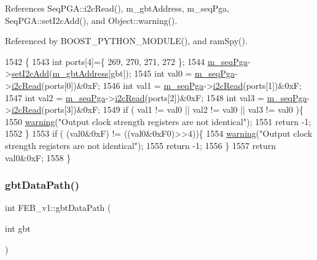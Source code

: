 References Seq\+P\+G\+A\+::i2c\+Read(), m\+\_\+gbt\+Address, m\+\_\+seq\+Pga, Seq\+P\+G\+A\+::set\+I2c\+Add(), and Object\+::warning().



Referenced by B\+O\+O\+S\+T\+\_\+\+P\+Y\+T\+H\+O\+N\+\_\+\+M\+O\+D\+U\+L\+E(), and ram\+Spy().


\begin{DoxyCode}
1542                                    \{
1543   \textcolor{keywordtype}{int} ports[4]=\{ 269, 270, 271, 272 \};
1544   \hyperlink{classFEB__v1_a6c7804ac86796f233a8393043adf2e77}{m\_seqPga}->\hyperlink{classSeqPGA_a4ef334e4d2cb417b49033dce951728cd}{setI2cAdd}(\hyperlink{classFEB__v1_ac625855df976f16694178f1a4c0eef1e}{m\_gbtAddress}[gbt]);
1545   \textcolor{keywordtype}{int} val0 = \hyperlink{classFEB__v1_a6c7804ac86796f233a8393043adf2e77}{m\_seqPga}->\hyperlink{classSeqPGA_a7cd344df2be99f3a02b487f80e87b27e}{i2cRead}(ports[0])&0xF; 
1546   \textcolor{keywordtype}{int} val1 = \hyperlink{classFEB__v1_a6c7804ac86796f233a8393043adf2e77}{m\_seqPga}->\hyperlink{classSeqPGA_a7cd344df2be99f3a02b487f80e87b27e}{i2cRead}(ports[1])&0xF; 
1547   \textcolor{keywordtype}{int} val2 = \hyperlink{classFEB__v1_a6c7804ac86796f233a8393043adf2e77}{m\_seqPga}->\hyperlink{classSeqPGA_a7cd344df2be99f3a02b487f80e87b27e}{i2cRead}(ports[2])&0xF; 
1548   \textcolor{keywordtype}{int} val3 = \hyperlink{classFEB__v1_a6c7804ac86796f233a8393043adf2e77}{m\_seqPga}->\hyperlink{classSeqPGA_a7cd344df2be99f3a02b487f80e87b27e}{i2cRead}(ports[3])&0xF; 
1549   \textcolor{keywordflow}{if} ( val1 != val0 || val2 != val0 || val3 != val0 )\{
1550       \hyperlink{classObject_a65cd4fda577711660821fd2cd5a3b4c9}{warning}(\textcolor{stringliteral}{"Output clock strength registers are not identical"});
1551       \textcolor{keywordflow}{return} -1;
1552   \}
1553   \textcolor{keywordflow}{if} ( (val0&0xF) != ((val0&0xF0)>>4))\{
1554       \hyperlink{classObject_a65cd4fda577711660821fd2cd5a3b4c9}{warning}(\textcolor{stringliteral}{"Output clock strength registers are not identical"});
1555       \textcolor{keywordflow}{return} -1;
1556     \}
1557   \textcolor{keywordflow}{return} val0&0xF;
1558 \}
\end{DoxyCode}
\mbox{\label{classFEB__v1_adf46e43506d1bd7cd26ca62c685e6c98}} 
\subsubsection{\texorpdfstring{gbt\+Data\+Path()}{gbtDataPath()}}
{\footnotesize\ttfamily int F\+E\+B\+\_\+v1\+::gbt\+Data\+Path (\begin{DoxyParamCaption}\item[{int}]{gbt }\end{DoxyParamCaption})}



